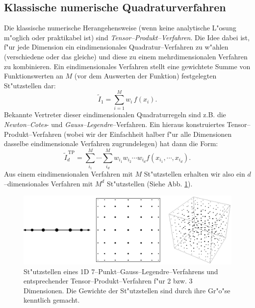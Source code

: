 	\subsection{Klassische numerische Quadraturverfahren}
	Die klassische numerische Herangehensweise (wenn keine analytische L"osung m"oglich oder praktikabel ist) sind {\em Tensor--Produkt--Verfahren}. Die Idee dabei ist, f"ur jede Dimension ein eindimensionales Quadratur--Verfahren zu w"ahlen (verschiedene oder das gleiche) und diese zu einem mehrdimensionalen Verfahren zu kombinieren. Ein eindimensionales Verfahren stellt eine gewichtete Summe von Funktionswerten an $M$ (vor dem Auswerten der Funktion) festgelegten St"utzstellen dar:
	$${\tilde I}_1=\sum_{i=1}^M w_i\,f(x_i).$$
	Bekannte Vertreter dieser eindimensionalen Quadraturregeln sind z.B. die {\em Newton--Cotes}- und {\em Gauss--Legendre}--Verfahren. Ein hieraus konstruiertes Tensor--Produkt--Verfahren (wobei wir der Einfachheit halber f"ur alle Dimensionen dasselbe eindimensionale Verfahren zugrundelegen) hat dann die Form:
	$${\tilde I}_d^{\,\text{TP}}=\sum_{i_1}^M\cdots\sum_{i_d}^M w_{i_1}w_{i_2}\cdots w_{i_d}f(x_{i_1},\cdots,x_{i_d}).$$
	Aus einem eindimensionalen Verfahren mit $M$ St"utzstellen erhalten wir also ein $d$--dimensionales Verfahren mit $M^d$ St"utzstellen (Siehe Abb. {\ref{fig:tensorproduct}}).
	\begin{figure}
		\centering
		\includegraphics[height=0.25\textheight]{tensorproduct_quadrature.eps}
		\caption{St"utzstellen eines 1D 7--Punkt--Gauss--Legendre--Verfahrens und entsprechender Tensor--Produkt--Verfahren f"ur 2 bzw. 3 Dimensionen. Die Gewichte der St"utzstellen sind durch ihre Gr"o"se kenntlich gemacht.}
		\label{fig:tensorproduct}
	\end{figure}
	
